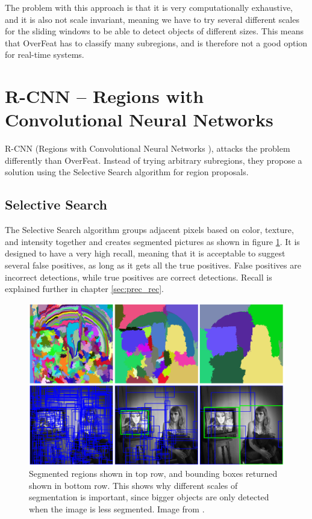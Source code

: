 \vspace{3mm}

\noindent
The problem with this approach is that it is very computationally exhaustive, and it is also not scale invariant, meaning we have to try several different scales for the sliding windows to be able to detect objects of different sizes. This means that OverFeat has to classify many subregions, and is therefore not a good option for real-time systems.


\section{R-CNN – Regions with Convolutional Neural Networks }
R-CNN (Regions with Convolutional Neural Networks  \citep{R-CNN}), attacks the problem differently than OverFeat. Instead of trying arbitrary subregions, they propose a solution using the Selective Search algorithm for region proposals.

\subsection{Selective Search }
The Selective Search algorithm \citep{SelSearch} groups adjacent pixels based on color, texture, and intensity together and creates segmented pictures as shown in figure \ref{fig:sel_serach}. It is designed to have a very high recall, meaning that it is acceptable to suggest several false positives, as long as it gets all the true positives. False positives are incorrect detections, while true positives are correct detections. Recall is explained further in chapter \ref{sec:prec_rec}.

\begin{figure}[h!]
    \centering
    \includegraphics[width=0.8 \textwidth]{fig/sel_search.png}
    \caption{Segmented regions shown in top row, and bounding boxes returned shown in bottom row. This shows why different scales of segmentation is important, since bigger objects are only detected when the image is less segmented. Image from \citep{SelSearch}.}
    \label{fig:sel_serach}
\end{figure}

